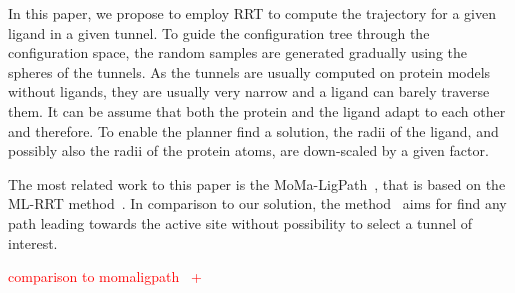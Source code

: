 \documentclass{svmult}
\newcommand{\red}[1]{\textcolor{red}{#1}}
\begin{document}

In this paper, we propose to employ RRT to compute the trajectory for a given ligand in a given tunnel.
To guide the configuration tree through the configuration space, the random samples are generated gradually using the spheres of the tunnels.
As the tunnels are usually computed on protein models without ligands, they are usually very narrow and a ligand can barely traverse them.
It can be assume that both the protein and the ligand adapt to each other and therefore.
To enable the planner find a solution, the radii of the ligand, and possibly also the radii of the protein atoms, are down-scaled
by a given factor.

The most related work to this paper is the MoMa-LigPath~\cite{cortes2005path}, that is based on the ML-RRT method~\cite{cortes2010simulating,cortes2007mlrrt}.
In comparison to our solution, the method~\cite{cortes2005path} aims for find any path leading towards the active site without
possibility to select a tunnel of interest.


\red{comparison to momaligpath~\cite{cortes2005path} + \cite{guieysse2008structure} }

\end{document}
